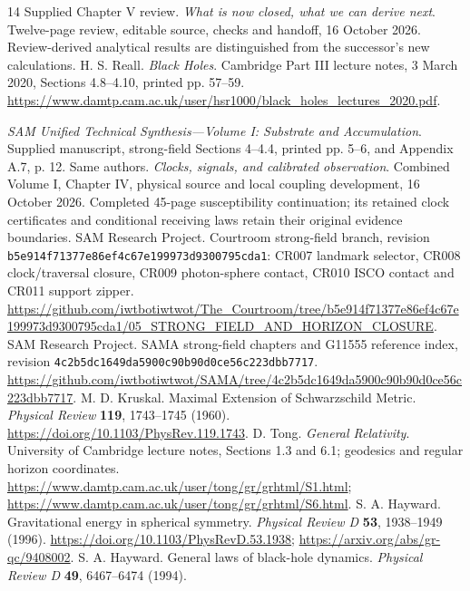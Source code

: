 \documentclass[10pt,twocolumn,letterpaper]{article}
\begin{document}
\begin{thebibliography}{14}
\small
\setlength{\itemsep}{1pt}
\setlength{\parskip}{0pt}
 Supplied Chapter V review.
\emph{What is now closed, what we can derive next}. Twelve-page review,
editable source, checks and handoff, 16 October 2026. Review-derived
analytical results are distinguished from the successor's new calculations.
 H. S. Reall. \emph{Black Holes}. Cambridge Part III
lecture notes, 3 March 2020, Sections 4.8--4.10, printed pp. 57--59.
\url{https://www.damtp.cam.ac.uk/user/hsr1000/black_holes_lectures_2020.pdf}.\small
\raggedright
{}
\emph{SAM Unified Technical Synthesis---Volume I: Substrate and
Accumulation}. Supplied manuscript, strong-field Sections 4--4.4,
printed pp. 5--6, and Appendix A.7, p. 12.
 Same authors. \emph{Clocks, signals, and calibrated
observation}. Combined Volume I, Chapter IV, physical source and local
coupling development, 16 October 2026. Completed 45-page susceptibility continuation;
its retained clock certificates and conditional receiving laws
retain their original evidence boundaries.
 SAM Research Project. Courtroom strong-field
branch, revision \texttt{b5e914f71377e86ef4c67e199973d9300795cda1}:
CR007 landmark selector, CR008 clock/traversal closure, CR009
photon-sphere contact, CR010 ISCO contact and CR011 support zipper.
\url{https://github.com/iwtbotiwtwot/The_Courtroom/tree/b5e914f71377e86ef4c67e199973d9300795cda1/05_STRONG_FIELD_AND_HORIZON_CLOSURE}.
 SAM Research Project. SAMA strong-field chapters and
G11555 reference index, revision
\texttt{4c2b5dc1649da5900c90b90d0ce56c223dbb7717}.
\url{https://github.com/iwtbotiwtwot/SAMA/tree/4c2b5dc1649da5900c90b90d0ce56c223dbb7717}.
 M. D. Kruskal. Maximal Extension of Schwarzschild
Metric. \emph{Physical Review} \textbf{119}, 1743--1745 (1960).
\url{https://doi.org/10.1103/PhysRev.119.1743}.
 D. Tong. \emph{General Relativity}. University of
Cambridge lecture notes, Sections 1.3 and 6.1; geodesics and regular
horizon coordinates.
\url{https://www.damtp.cam.ac.uk/user/tong/gr/grhtml/S1.html};
\url{https://www.damtp.cam.ac.uk/user/tong/gr/grhtml/S6.html}.
 S. A. Hayward. Gravitational energy in spherical
symmetry. \emph{Physical Review D} \textbf{53}, 1938--1949 (1996).
\url{https://doi.org/10.1103/PhysRevD.53.1938};
\url{https://arxiv.org/abs/gr-qc/9408002}.
\newpage
{} S. A. Hayward. General laws of black-hole
dynamics. \emph{Physical Review D} \textbf{49}, 6467--6474 (1994).

\end{thebibliography}
\end{document}
